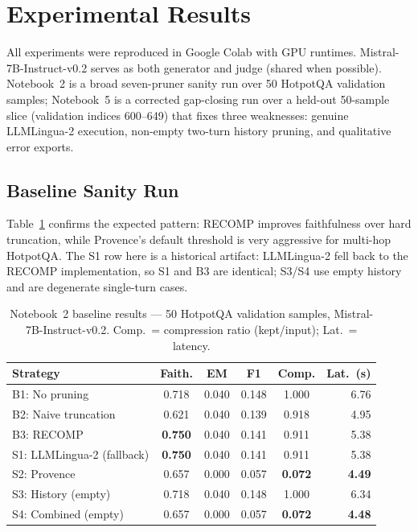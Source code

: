 \documentclass[runningheads]{llncs}
\begin{document}
\section{Experimental Results}

All experiments were reproduced in Google Colab with GPU runtimes.
Mistral-7B-Instruct-v0.2 serves as both generator and judge (shared when
possible). Notebook~2 is a broad seven-pruner sanity run over 50 HotpotQA
validation samples; Notebook~5 is a corrected gap-closing run over a held-out
50-sample slice (validation indices 600--649) that fixes three weaknesses:
genuine LLMLingua-2 execution, non-empty two-turn history pruning, and
qualitative error exports.

\subsection{Baseline Sanity Run}

Table~\ref{tab:baseline} confirms the expected pattern: RECOMP improves
faithfulness over hard truncation, while Provence's default threshold is very
aggressive for multi-hop HotpotQA. The S1 row here is a historical artifact:
LLMLingua-2 fell back to the RECOMP implementation, so S1 and B3 are identical;
S3/S4 use empty history and are degenerate single-turn cases.

\begin{table}[t]
\centering
\caption{Notebook~2 baseline results --- 50 HotpotQA validation samples,
Mistral-7B-Instruct-v0.2. Comp.\ = compression ratio (kept/input);
Lat.\ = latency.}\label{tab:baseline}
\begin{tabular}{lccccr}
\toprule
\textbf{Strategy} & \textbf{Faith.} & \textbf{EM} & \textbf{F1} & \textbf{Comp.} & \textbf{Lat.\ (s)}\\
\midrule
B1: No pruning            & 0.718 & 0.040 & 0.148 & 1.000 & 6.76\\
B2: Naive truncation      & 0.621 & 0.040 & 0.139 & 0.918 & 4.95\\
B3: RECOMP                & \textbf{0.750} & 0.040 & 0.141 & 0.911 & 5.38\\
S1: LLMLingua-2 (fallback)& \textbf{0.750} & 0.040 & 0.141 & 0.911 & 5.38\\
S2: Provence              & 0.657 & 0.000 & 0.057 & \textbf{0.072} & \textbf{4.49}\\
S3: History (empty)       & 0.718 & 0.040 & 0.148 & 1.000 & 6.34\\
S4: Combined (empty)      & 0.657 & 0.000 & 0.057 & \textbf{0.072} & \textbf{4.48}\\
\bottomrule
\end{tabular}
\end{table}
\end{document}
